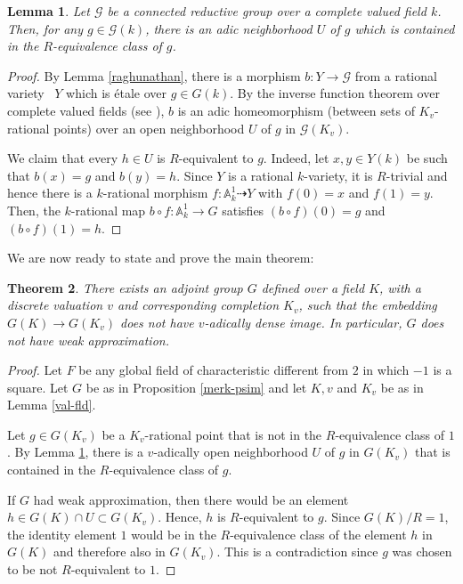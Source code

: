 \documentclass[11pt,letterpaper]{amsart}
\theoremstyle{plain}
\newtheorem{theorem}{Theorem}
\newtheorem{lemma}[theorem]{Lemma}
\theoremstyle{definition}
\theoremstyle{remark}
\begin{document}
    \begin{lemma}\label{r-eq-open}
        Let $\mathcal{G}$ be a connected reductive group over a complete valued field $k$. Then, for any $g\in \mathcal{G}(k)$, there is an adic neighborhood $U$ of $g$ which is contained in the $R$-equivalence class of $g$.
    \end{lemma}
    \begin{proof}
        By Lemma \ref{raghunathan}, there is a morphism $b\colon Y\to \mathcal{G}$ from a rational variety~ $Y$ which is \'{e}tale over $g\in G(k)$. By the inverse function theorem over complete valued fields (see \cite[Corollary 2.1.1(ii)]{igusa2000introduction}), $b$ is an adic homeomorphism (between sets of $K_v$-rational points) over an open neighborhood $U$ of $g$ in $\mathcal{G}(K_v)$.

        We claim that every $h\in U$ is $R$-equivalent to $g$. Indeed, let $x,y\in Y(k)$ be such that $b(x)=g$ and $b(y) = h$. Since $Y$ is a rational $k$-variety, it is $R$-trivial and hence there is a $k$-rational morphism $f\colon\mathbb{A}_k^1\dashrightarrow Y$ with $f(0) = x$ and $f(1)=y$. Then, the $k$-rational map $b\circ f\colon \mathbb{A}_k^1\to G$ satisfies $(b\circ f)(0)=g$ and $(b\circ f)(1)=h$.
    \end{proof}

    We are now ready to state and prove the main theorem:

    \begin{theorem}\label{conjecture-disproved}
    There exists an adjoint group $G$ defined over a  field $K$, with a discrete valuation $v$ and corresponding completion $K_v$, such that the embedding $G(K)\to G(K_v)$ does not have $v$-adically dense image. In particular, $G$ does not have weak approximation.
\end{theorem}
\begin{proof}
    Let $F$ be any global field of characteristic different from $2$ in which $-1$ is a square. Let $G$ be as in Proposition \ref{merk-psim} and let $K,v$ and $K_v$ be as in Lemma \ref{val-fld}.
    
    Let $g\in G(K_v)$ be a $K_v$-rational point that is not in the $R$-equivalence class of $1$. By Lemma \ref{r-eq-open}, there is a $v$-adically open neighborhood $U$ of $g$ in $G(K_v)$ that is contained in the $R$-equivalence class of $g$.

    If $G$ had weak approximation, then there would be an element $h\in G(K)\cap U\subset G(K_v)$. Hence, $h$ is $R$-equivalent to $g$. Since $G(K)/R=1$, the identity element $1$ would be in the $R$-equivalence class of the element $h$ in $G(K)$ and therefore also in $G(K_v)$. This is a contradiction since $g$ was chosen to be not $R$-equivalent to $1$.
\end{proof}
\end{document}
